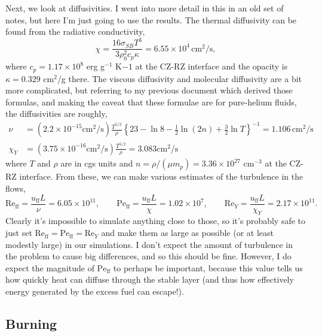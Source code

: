 \documentclass[onecolumn, amsmath, amsfonts, amssymb]{aastex62}
\begin{document}
Next, we look at diffusivities.
I went into more detail in this in an old set of notes, but here I'm just going to use the results.
The thermal diffusivity can be found from the radiative conductivity,
\begin{equation}
\chi = \frac{16 \sigma_{SB} T^3}{3 \rho_0^2 c_p \kappa} = 6.55 \times 10^{4} \,\mathrm{cm}^2/\mathrm{s},
\end{equation}
where $c_p = 1.17 \times 10^{8}$ erg g$^{-1}$ K${-1}$ at the CZ-RZ interface and the opacity is $\kappa = 0.329$ cm$^2$/g there.
The viscous diffusivity and molecular diffusivity are a bit more complicated, but referring to my previous document which derived those formulas, and making the caveat that these formulae are for pure-helium fluids, the diffusivities are roughly,
\begin{align}
\nu &= (2.2 \times 10^{-15}\mathrm{cm}^2/\mathrm{s})\frac{T^{5/2}}{\rho}\left\{23 - \ln 8 - \frac{1}{2}\ln(2 n) +\frac{3}{2}\ln T\right\}^{-1} = 1.106 \,\mathrm{cm}^2/\mathrm{s} \\
\chi_Y &= (3.75 \times 10^{-16}\mathrm{cm}^2/\mathrm{s})\frac{T^{5/2}}{\rho} = 3.083 \mathrm{cm}^2/\mathrm{s}
\end{align}
where $T$ and $\rho$ are in cgs units and $n = \rho/(\mu m_p) = 3.36 \times 10^{27}$ cm$^{-3}$ at the CZ-RZ interface.
From these, we can make various estimates of the turbulence in the flows,
\begin{equation}
\mathrm{Re}_{\mathrm{ff}} = \frac{u_{\mathrm{ff}} L}{\nu} = 6.05 \times 10^{11},\qquad
\mathrm{Pe}_{\mathrm{ff}} = \frac{u_{\mathrm{ff}} L}{\chi} = 1.02 \times 10^7,\qquad
\mathrm{Re}_Y             = \frac{u_{\mathrm{ff}} L}{\chi_Y} = 2.17 \times 10^{11}.
\end{equation}
Clearly it's impossible to simulate anything close to those, so it's probably safe to just set $\mathrm{Re}_{\mathrm{ff}} = \mathrm{Pe}_{\mathrm{ff}} = \mathrm{Re}_Y$ and make them as large as possible (or at least modestly large) in our simulations.
I don't expect the amount of turbulence in the problem to cause big differences, and so this should be fine.
However, I do expect the magnitude of $\mathrm{Pe}_{\mathrm{ff}}$ to perhaps be important, because this value tells us how quickly heat can diffuse through the stable layer (and thus how effectively energy generated by the excess fuel can escape!).

\subsection{Burning}
\end{document}
